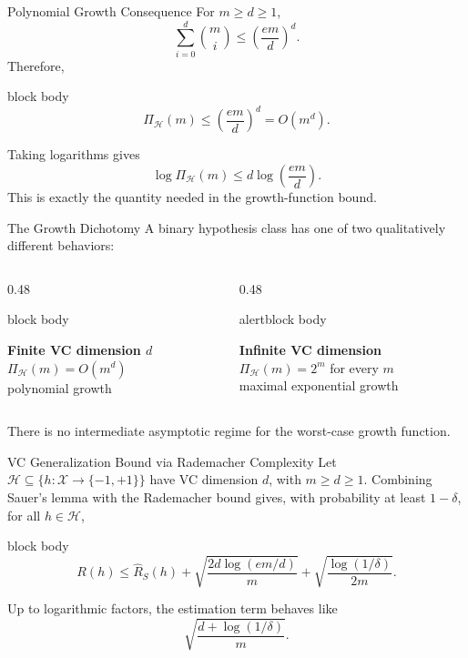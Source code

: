 \documentclass[aspectratio=169,10pt]{beamer}
\newcommand{\X}{\mathcal{X}}
\newcommand{\Hc}{\mathcal{H}}
\newcommand{\Rhat}{\widehat{R}_S}
\newcommand{\PiH}{\Pi_{\Hc}}
\newcommand{\pmone}{\{-1,+1\}}
\newcommand{\KeyBox}[1]{%
  \begin{beamercolorbox}[rounded=true,sep=0.22cm,wd=\linewidth]{block body}
    #1
  \end{beamercolorbox}%
}
\newcommand{\OrangeBox}[1]{%
  \begin{beamercolorbox}[rounded=true,sep=0.22cm,wd=\linewidth]{alertblock body}
    #1
  \end{beamercolorbox}%
}
\begin{document}
\begin{frame}[t]{Polynomial Growth Consequence}
  \vspace{0.02cm}
  For $m\ge d\ge1$,
  \[
    \sum_{i=0}^{d}\binom{m}{i}
    \le \left(\frac{em}{d}\right)^d.
  \]
  Therefore,
  \begin{beamercolorbox}[rounded=true,sep=0.20cm,wd=\linewidth]{block body}
    \[
      \boxed{
      \PiH(m)\le\left(\frac{em}{d}\right)^d=O(m^d).}
    \]
  \end{beamercolorbox}
  \vspace{0.14cm}
  Taking logarithms gives
  \[
    \log\PiH(m)\le d\log\!\left(\frac{em}{d}\right).
  \]
  This is exactly the quantity needed in the growth-function bound.
\end{frame}

\begin{frame}[t]{The Growth Dichotomy}
  \vspace{0.04cm}
  A binary hypothesis class has one of two qualitatively different behaviors:
  \vspace{0.08cm}
  \begin{columns}[T,totalwidth=\textwidth]
    \begin{column}{0.48\textwidth}
      \KeyBox{
      \centering
      \textbf{Finite VC dimension $d$}\\[0.10cm]
      $\PiH(m)=O(m^d)$\\
      polynomial growth}
    \end{column}
    \begin{column}{0.48\textwidth}
      \OrangeBox{
      \centering
      \textbf{Infinite VC dimension}\\[0.10cm]
      $\PiH(m)=2^m$ for every $m$\\
      maximal exponential growth}
    \end{column}
  \end{columns}
  \vspace{0.18cm}
  \centering
  There is no intermediate asymptotic regime for the worst-case growth function.
\end{frame}

\begin{frame}[t]{VC Generalization Bound via Rademacher Complexity}
  \vspace{0.02cm}
  Let $\Hc\subseteq\{h:\X\to\pmone\}$ have VC dimension $d$, with $m\ge d\ge1$. Combining Sauer's lemma with the Rademacher bound gives, with probability at least $1-\delta$, for all $h\in\Hc$,
  \begin{beamercolorbox}[rounded=true,sep=0.18cm,wd=\linewidth]{block body}
    \[
      \boxed{
      R(h)\le\Rhat(h)
      +\sqrt{\frac{2d\log(em/d)}{m}}
      +\sqrt{\frac{\log(1/\delta)}{2m}}.}
    \]
  \end{beamercolorbox}
  \vspace{0.10cm}
  Up to logarithmic factors, the estimation term behaves like
  \[
    \sqrt{\frac{d+\log(1/\delta)}{m}}.
  \]
\end{frame}
\end{document}

